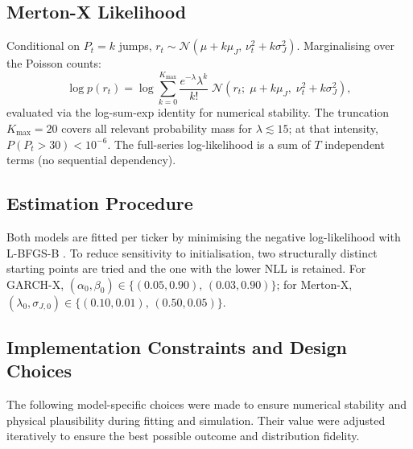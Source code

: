 \subsection{Merton-X Likelihood}

Conditional on $P_t = k$ jumps, $r_t \sim \mathcal{N}(\mu + k\mu_J,\,
\nu_t^2 + k\sigma_J^2)$. Marginalising over the Poisson counts:
\begin{equation}
    \label{eq:mertonx_loglik_app}
    \log p(r_t) = \log \sum_{k=0}^{K_{\max}}
        \frac{e^{-\lambda}\lambda^k}{k!}\;
        \mathcal{N}\!\left(r_t;\; \mu + k\mu_J,\;
        \nu_t^2 + k\sigma_J^2\right),
\end{equation}
evaluated via the log-sum-exp identity for numerical stability. The
truncation $K_{\max} = 20$ covers all relevant probability mass for
$\lambda \lesssim 15$; at that intensity, $P(P_t > 30) < 10^{-6}$.
The full-series log-likelihood is a sum of $T$ independent terms (no
sequential dependency).

\subsection{Estimation Procedure}
\label{app:subsec:garch_merton_constraints}

Both models are fitted per ticker by minimising the negative
log-likelihood with L-BFGS-B \cite{byrd1995limited}. To reduce
sensitivity to initialisation, two structurally distinct starting
points are tried and the one with the lower NLL is retained. For
GARCH-X, $(\alpha_0, \beta_0) \in \{(0.05, 0.90),\, (0.03, 0.90)\}$;
for Merton-X, $(\lambda_0, \sigma_{J,0}) \in \{(0.10, 0.01),\,
(0.50, 0.05)\}$.

\subsection{Implementation Constraints and Design Choices}
\label{app:baselines_constraints}

The following model-specific choices were made to ensure numerical stability and physical plausibility during fitting and simulation. Their value were adjusted iteratively to ensure the best possible outcome and distribution fidelity. 

